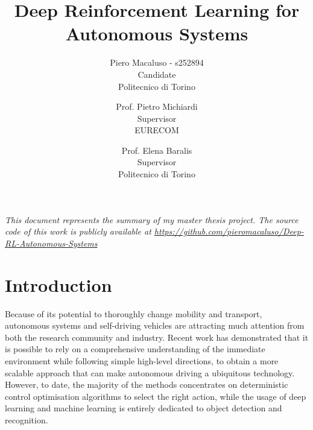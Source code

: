 \documentclass[10pt,twocolumn,letterpaper]{article}
\begin{document}
\title{Deep Reinforcement Learning for Autonomous Systems}

\author{Piero Macaluso - s252894\\
    Candidate\\
    Politecnico di Torino\\
    \and
    Prof. Pietro Michiardi\\
    Supervisor\\
    EURECOM\\
    \and
    Prof. Elena Baralis\\
    Supervisor\\
    Politecnico di Torino\\
}

\maketitle


\textit{This document represents the summary of my master thesis project. The source code of this work is publicly available at \url{https://github.com/pieromacaluso/Deep-RL-Autonomous-Systems}}
\section{Introduction}

Because of its potential to thoroughly change mobility and transport, autonomous systems and self-driving vehicles are attracting much attention from both the research community and industry.
Recent work has demonstrated that it is possible to rely on a comprehensive understanding of the immediate environment while following simple high-level directions, to obtain a more scalable approach that can make autonomous driving a ubiquitous technology.
However, to date, the majority of the methods concentrates on deterministic control optimisation algorithms to select the right action, while the usage of deep learning and machine learning is entirely dedicated to object detection and recognition.
\end{document}
